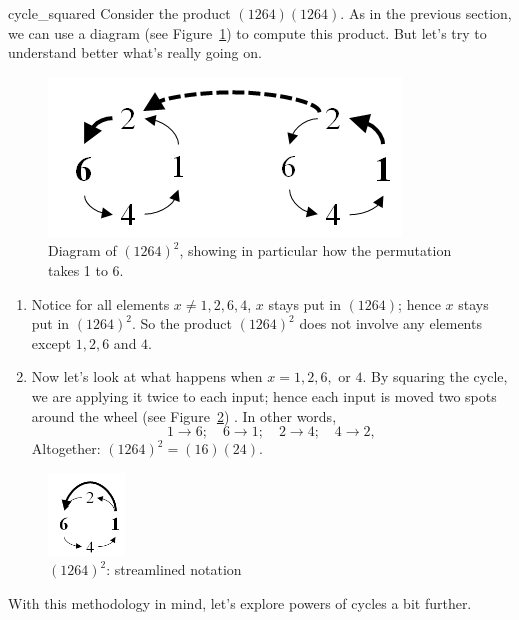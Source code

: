 \begin{example}{cycle_squared}
Consider the product $(1264)(1264)$. As in the previous section, we can use a diagram (see Figure~\ref{fig:perm_square}) to compute this product. But let's try to understand better what's really going on.

\begin{figure}[ht]
\begin{center}
\includegraphics[width=2.in]{images/perm_square.png}
\caption{Diagram of $(1264)^2$, showing in particular how the permutation takes 1 to 6.}\label{fig:perm_square}
\end{center}
\end{figure}

\begin{enumerate}[(1)]
\item
Notice for all elements $x \neq 1, 2, 6, 4$, $x$ stays put in $(1264)$; hence $x$ stays put in $(1264)^2$.  So the product $(1264)^2$ does not involve any elements except $1, 2, 6$ and $4$.
\item
Now let's look at what happens when $x = 1, 2, 6,$ or $4$.   By squaring the cycle, we are applying it twice to each input; hence each input is moved two spots around the wheel (see Figure~\ref{fig:perm_square2}) .  In other words,  
\[
1 \to 6;  \quad 6 \to 1; \quad 2 \to 4; \quad 4 \to 2,
\]
Altogether: $(1264)^2 = (16)(24)$.
\end{enumerate}

\begin{figure}[ht]
\begin{center}
\includegraphics[width=0.8in]{images/perm_square2.png}
\caption{$(1264)^2$: streamlined notation}\label{fig:perm_square2}
\end{center}
\end{figure}


\end{example}

\noindent
With this methodology in mind, let's  explore powers of cycles a bit further.

